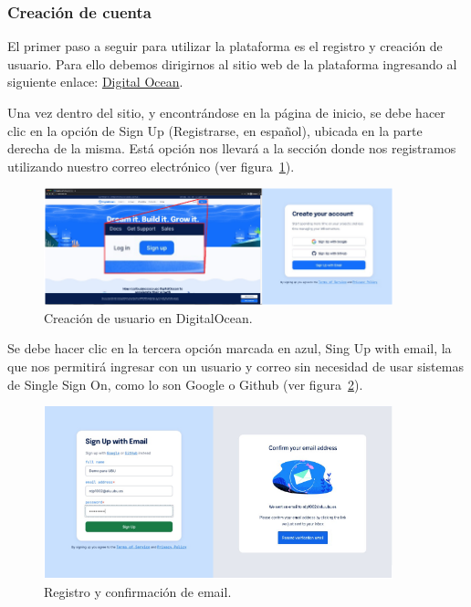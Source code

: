 \subsubsection{Creación de cuenta}
 El primer paso a seguir para utilizar la plataforma es el registro y creación de usuario. Para ello debemos dirigirnos al sitio web de la plataforma ingresando al siguiente enlace: \href{https://www.digitalocean.com/}{Digital Ocean}.

Una vez dentro del sitio, y encontrándose en la página de inicio, se debe hacer clic en la opción de Sign Up (Registrarse, en español), ubicada en la parte derecha de la misma. Está opción nos llevará a la sección donde nos registramos utilizando nuestro correo electrónico (ver figura~\ref{Img:Web+Digital+Ocean}).

\begin{figure}[h]
    \centering
    \includegraphics[width=0.9\textwidth]{img/infraestructura/pagina_digital_ocean.png}
    \caption{Creación de usuario en DigitalOcean.} \label{Img:Web+Digital+Ocean}
\end{figure}

Se debe hacer clic en la tercera opción marcada en azul, Sing Up with email, la que nos permitirá ingresar con un usuario y correo sin necesidad de usar sistemas de Single Sign On, como lo son Google o Github (ver figura~\ref{Img:Web+Registro+en+Digital+Ocean}).

\begin{figure}[h]
    \centering
    \includegraphics[width=0.9\textwidth]{img/infraestructura/pagina_de_registro.png}
    \caption{Registro y confirmación de email.} \label{Img:Web+Registro+en+Digital+Ocean}
\end{figure} 

